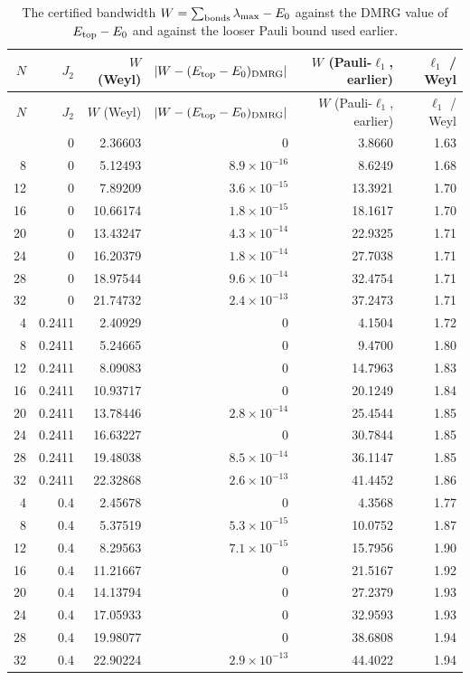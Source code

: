 \documentclass[11pt]{article}
\begin{document}
{\small
\begin{longtable}{rrrrrr}
\caption{The certified bandwidth $W=\sum_{\rm bonds}\lambda_{\max}-E_0$ against the DMRG value of $E_{\rm top}-E_0$ and against the looser Pauli bound used earlier.}\label{tab:bw}\\
\toprule
$N$ & $J_2$ & $W$ (Weyl) & $|W-(E_{\rm top}-E_0)_{\rm DMRG}|$ & $W$ (Pauli-$\ell_1$, earlier) & $\ell_1$ / Weyl \\
\midrule
\endfirsthead
\toprule
$N$ & $J_2$ & $W$ (Weyl) & $|W-(E_{\rm top}-E_0)_{\rm DMRG}|$ & $W$ (Pauli-$\ell_1$, earlier) & $\ell_1$ / Weyl \\
\midrule
\endhead
\bottomrule
\endfoot
4 & 0 & 2.36603 & $0$ & 3.8660 & 1.63 \\
8 & 0 & 5.12493 & $8.9\times10^{-16}$ & 8.6249 & 1.68 \\
12 & 0 & 7.89209 & $3.6\times10^{-15}$ & 13.3921 & 1.70 \\
16 & 0 & 10.66174 & $1.8\times10^{-15}$ & 18.1617 & 1.70 \\
20 & 0 & 13.43247 & $4.3\times10^{-14}$ & 22.9325 & 1.71 \\
24 & 0 & 16.20379 & $1.8\times10^{-14}$ & 27.7038 & 1.71 \\
28 & 0 & 18.97544 & $9.6\times10^{-14}$ & 32.4754 & 1.71 \\
32 & 0 & 21.74732 & $2.4\times10^{-13}$ & 37.2473 & 1.71 \\
4 & 0.2411 & 2.40929 & $0$ & 4.1504 & 1.72 \\
8 & 0.2411 & 5.24665 & $0$ & 9.4700 & 1.80 \\
12 & 0.2411 & 8.09083 & $0$ & 14.7963 & 1.83 \\
16 & 0.2411 & 10.93717 & $0$ & 20.1249 & 1.84 \\
20 & 0.2411 & 13.78446 & $2.8\times10^{-14}$ & 25.4544 & 1.85 \\
24 & 0.2411 & 16.63227 & $0$ & 30.7844 & 1.85 \\
28 & 0.2411 & 19.48038 & $8.5\times10^{-14}$ & 36.1147 & 1.85 \\
32 & 0.2411 & 22.32868 & $2.6\times10^{-13}$ & 41.4452 & 1.86 \\
4 & 0.4 & 2.45678 & $0$ & 4.3568 & 1.77 \\
8 & 0.4 & 5.37519 & $5.3\times10^{-15}$ & 10.0752 & 1.87 \\
12 & 0.4 & 8.29563 & $7.1\times10^{-15}$ & 15.7956 & 1.90 \\
16 & 0.4 & 11.21667 & $0$ & 21.5167 & 1.92 \\
20 & 0.4 & 14.13794 & $0$ & 27.2379 & 1.93 \\
24 & 0.4 & 17.05933 & $0$ & 32.9593 & 1.93 \\
28 & 0.4 & 19.98077 & $0$ & 38.6808 & 1.94 \\
32 & 0.4 & 22.90224 & $2.9\times10^{-13}$ & 44.4022 & 1.94 \\
\end{longtable}
}
\end{document}
